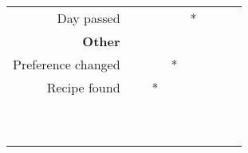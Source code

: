 \begin{table}
\begin{tabular}{|r|c|c|c|c|c|c|}
        Day passed                             & ~       & ~      & ~    & *    & ~ & ~ \\ 
        \textbf{Other}                         & ~       & ~      & ~    & ~    & ~ & ~ \\ 
        Preference changed                     & ~       & ~      & *    & ~    & ~ & ~ \\ 
        Recipe found                           & ~       & *      & ~    & ~    & ~ & ~ \\ 
        ~                                      & ~       & ~      & ~    & ~    & ~ & ~ \\ 
        ~                                      & ~       & ~      & ~    & ~    & ~ & ~ \\
        \hline
    \end{tabular}
\end{table}